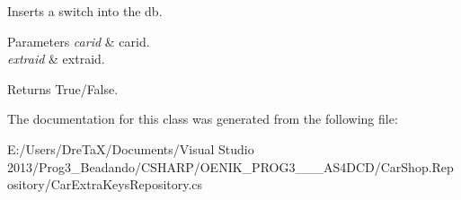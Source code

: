 Inserts a switch into the db. 


\begin{DoxyParams}{Parameters}
{\em carid} & carid.\\
\hline
{\em extraid} & extraid.\\
\hline
\end{DoxyParams}
\begin{DoxyReturn}{Returns}
True/\+False.
\end{DoxyReturn}


The documentation for this class was generated from the following file\+:\begin{DoxyCompactItemize}
\item 
E\+:/\+Users/\+Dre\+Ta\+X/\+Documents/\+Visual Studio 2013/\+Prog3\+\_\+\+Beadando/\+C\+S\+H\+A\+R\+P/\+O\+E\+N\+I\+K\+\_\+\+P\+R\+O\+G3\+\_\+\_\+\_\+\+A\+S4\+D\+C\+D/\+Car\+Shop.\+Repository/Car\+Extra\+Keys\+Repository.\+cs\end{DoxyCompactItemize}
